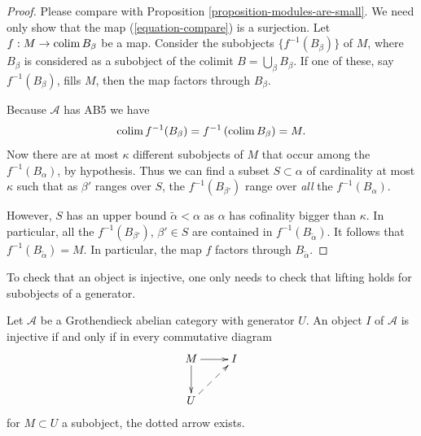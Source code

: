 \begin{proof}
Please compare with Proposition \ref{proposition-modules-are-small}.
We need only show that the map (\ref{equation-compare}) is a surjection.
Let $f : M \to \mathop{\mathrm{colim}}\nolimits B_\beta$ be a map.
Consider the subobjects $\{f^{-1}(B_\beta)\}$ of $M$, where $B_\beta$
is considered as a subobject of the colimit $B = \bigcup_\beta B_\beta$.
If one of these, say $f^{-1}(B_\beta)$, fills $M$,
then the map factors through $B_\beta$.

\medskip\noindent
Because $\mathcal{A}$ has AB5 we have
$$
\mathop{\mathrm{colim}}\nolimits f^{-1}(B_\beta) = f^{-1}\left(\mathop{\mathrm{colim}}\nolimits B_\beta\right) = M.
$$
Now there are at most $\kappa$ different subobjects of $M$ that occur among
the $f^{-1}(B_\alpha)$, by hypothesis.
Thus we can find a subset $S \subset \alpha$ of cardinality at most
$\kappa$ such that as $\beta'$ ranges over $S$, the
$f^{-1}(B_{\beta'})$ range over \emph{all} the $f^{-1}(B_\alpha)$.

\medskip\noindent
However, $S$ has an upper bound $\widetilde{\alpha} < \alpha$ as
$\alpha$ has cofinality bigger than $\kappa$. In particular, all the
$f^{-1}(B_{\beta'})$, $\beta' \in S$ are contained in
$f^{-1}(B_{\widetilde{\alpha}})$.
It follows that $f^{-1}(B_{\widetilde{\alpha}}) = M$.
In particular, the map $f$ factors through $B_{\widetilde{\alpha}}$.
\end{proof}

\begin{lemma}
\label{lemma-characterize-injective}
\begin{slogan}
To check that an object is injective, one only needs to check that lifting
holds for subobjects of a generator.
\end{slogan}
Let $\mathcal{A}$ be a Grothendieck abelian category with generator $U$.
An object $I$ of $\mathcal{A}$ is injective if and only if in every
commutative diagram
$$
\xymatrix{
M \ar[d] \ar[r] &  I \\
U \ar@{-->}[ru]
}
$$
for $M \subset U$ a subobject, the dotted arrow exists.
\end{lemma}

